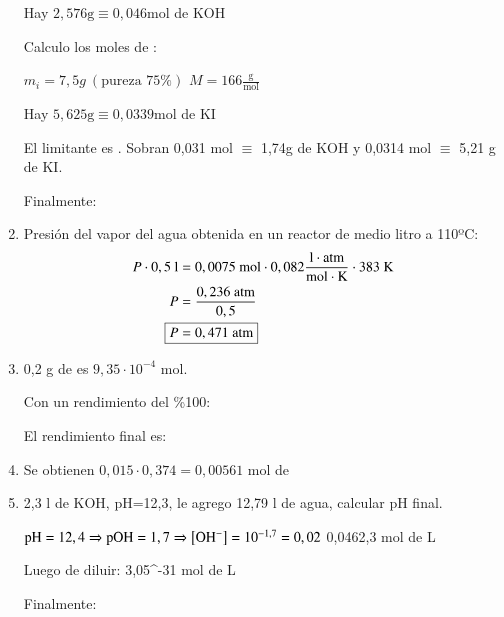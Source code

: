\begin{enumerate}
\hfil
Hay $2,576\text{g} \equiv 0,046 \text{mol}$ de KOH
\hfil

Calculo los moles de :

\hfil $m_i = 7,5g\ (\text{pureza }75\%)$
\hfil $M = 166\frac{\text{g}}{\text{mol}}$
\hfil

\hfil
Hay $5,625\text{g} \equiv 0,0339 \text{mol}$ de KI
\hfil

El limitante es . Sobran 0,031 mol $\equiv$ 1,74g de KOH y 0,0314 mol $\equiv$ 5,21 g de KI.

Finalmente: 

\hfil
{}
\hfil


\item Presión del vapor del agua obtenida en un reactor de medio litro a 110ºC:
\begin{align*}
    P \cdot 0,5 \text{ l} &= 0,0075 \text{ mol} \cdot 0,082 \frac{\text{l}\cdot \text{atm}}{\text{mol} \cdot \text{K}} \cdot 383 \text{ K}\\
    P &= \dfrac{0,236 \text{ atm}}{0,5}\\
    \Aboxed{P &= 0,471\text{ atm}}
\end{align*}


\newpage
\item 0,2 g de  es $9,35\cdot 10^{-4}$ mol.

Con un rendimiento del \%100:

El rendimiento final es:

\hfil{}\hfil


\item Se obtienen $0,015\cdot 0,374 = 0,00561$ mol de 
\hfil{}
\hfil


\item 2,3 l de KOH, pH=12,3, le agrego 12,79 l de agua, calcular pH final.

\hfil $\text{pH}=12,4 \Rightarrow \text{pOH} = 1,7 \Rightarrow \left[\ce{OH^-}\right] = 10^{-1,7} = 0,02 $
\hfil
{}
{0,046}{2,3}
{mol de }{L}

Luego de diluir:
{3,05^{-3}}{1}
{mol de }{L}

Finalmente:

\hfil {}\hfil



\end{enumerate}
